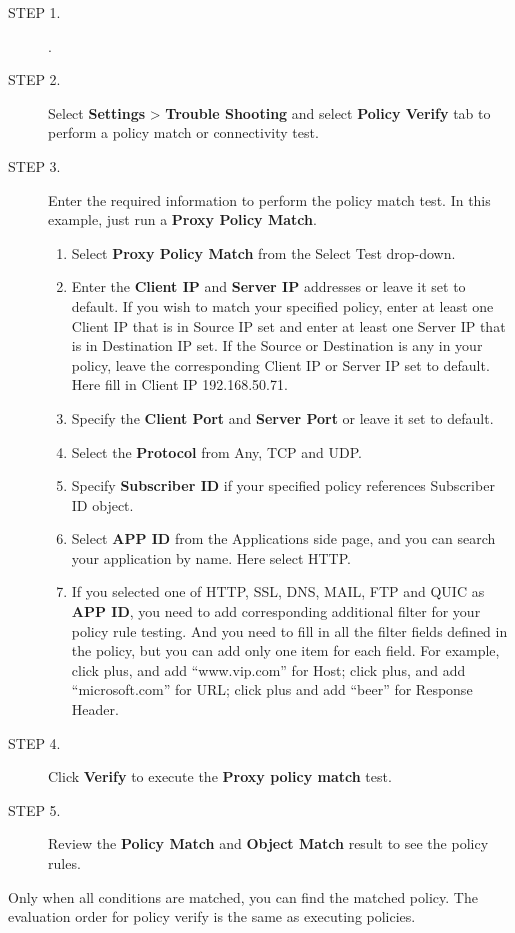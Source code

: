 \begin{description}
    \item[STEP 1.]	\hyperlink{link:Logging into the Web Interface}{\color{linkblue}{Logging into the Web Interface}}.
    \item[STEP 2.]	Select \textbf{Settings} > \textbf{Trouble Shooting} and select \textbf{Policy Verify} tab to perform a policy match or connectivity test.
    \item[STEP 3.]	Enter the required information to perform the policy match test. In this example, just run a \textbf{Proxy Policy Match}.
    \begin{enumerate} 
        \item Select \textbf{Proxy Policy Match} from the Select Test drop-down.
        \item Enter the \textbf{Client IP} and \textbf{Server IP} addresses or leave it set to default. If you wish to match your specified policy, enter at least one Client IP that is in Source IP set and enter at least one Server IP that is in Destination IP set. If the Source or Destination is any in your policy, leave the corresponding Client IP or Server IP set to default. Here fill in Client IP 192.168.50.71.
        \item Specify the \textbf{Client Port} and \textbf{Server Port} or leave it set to default.
        \item Select the \textbf{Protocol} from Any, TCP and UDP.
        \item Specify \textbf{Subscriber ID} if your specified policy references Subscriber ID object.
        \item Select \textbf{APP ID} from the Applications side page, and you can search your application by name. Here select HTTP.
        \item If you selected one of HTTP, SSL, DNS, MAIL, FTP and QUIC as \textbf{APP ID}, you need to add corresponding additional filter for your policy rule testing. And you need to fill in all the filter fields defined in the policy, but you can add only one item for each field. For example, click plus, and add “www.vip.com” for Host; click plus, and add “microsoft.com” for URL; click plus and add “beer” for Response Header.
    \end{enumerate}
    \item[STEP 4.]	Click \textbf{Verify} to execute the \textbf{Proxy policy match} test.
    \item[STEP 5.]	Review the \textbf{Policy Match} and \textbf{Object Match} result to see the policy rules.
\end{description} 


Only when all conditions are matched, you can find the matched policy. The evaluation order for policy verify is the same as executing policies.
